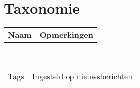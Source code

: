 \section{Taxonomie}\label{taxonomie}

\newcommand{\taxonomie}[2]{
  \begin{tabular}{ p{4cm} p{5cm} }
  #1 & #2
  \end{tabular}
  \\
}

\taxonomie{\textbf{Naam}}{\textbf{Opmerkingen}} 

\taxonomie{Tags}{Ingesteld op nieuwsberichten}
